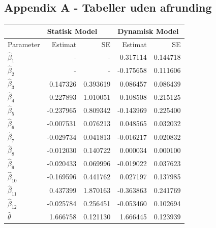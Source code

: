 \documentclass[11pt,a4paper]{article}
\begin{document}
\subsection{Appendix A - Tabeller uden afrunding}
\begin{table}[ht]
\centering
\begin{adjustbox}{max width=\textwidth}
\begin{tabular}{|l|rr|rr|}
\hline
\multicolumn{1}{|l|}{} & \multicolumn{2}{l|}{Statisk Model} & \multicolumn{2}{l|}{Dynamisk Model} \\
\hline
Parameter & Estimat & SE & Estimat & SE \\
  \hline
    $\hat{\beta}_1$ & - & - & 0.317114 & 0.144718\\
    $\hat{\beta}_2$ & - & - & -0.175658 & 0.111606\\
    $\hat{\beta}_3$ & 0.147326 & 0.393619 & 0.086457 & 0.086439\\
    $\hat{\beta}_4$ & 0.227893 & 1.010051 & 0.108508 & 0.215125\\
    $\hat{\beta}_5$ & -0.237965 & 0.809342 & -0.143969 & 0.225400\\
    $\hat{\beta}_6$ & -0.007531 & 0.076213 & 0.048565 & 0.032032\\
    $\hat{\beta}_7$ & -0.029734 & 0.041813 & -0.016217 & 0.020832\\
    $\hat{\beta}_8$ & -0.012030 & 0.140722 & 0.000034 & 0.000100\\
    $\hat{\beta}_9$ & -0.020433 & 0.069996 & -0.019022 & 0.037623\\
    $\hat{\beta}_{10}$ & -0.169596 & 0.441762 & 0.027197 & 0.137985\\
    $\hat{\beta}_{11}$ & 0.437399 & 1.870163 & -0.363863 & 0.241769\\
    $\hat{\beta}_{12}$ & -0.025784 & 0.256451 & -0.053460 & 0.102694\\
    $\hat{\theta}$ & 1.666758 & 0.121130 & 1.666445 & 0.123939\\
   \hline
\end{tabular}
\end{adjustbox}
\end{table}
\printbibliography %
\end{document}
